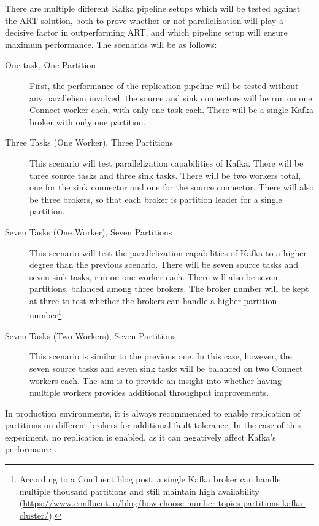 There are multiple different Kafka pipeline setups which will be tested against the \ac{ART} solution, both to prove whether or not parallelization will play a decisive factor in outperforming \ac{ART}, and which pipeline setup will ensure maximum performance. The scenarios will be as follows:
\begin{description}
    \item [One task, One Partition]
    First, the performance of the replication pipeline will be tested without any parallelism involved: the source and sink connectors will be run on one Connect worker each, with only one task each. There will be a single Kafka broker with only one partition.

    \item[Three Tasks (One Worker), Three Partitions]
    This scenario will test parallelization capabilities of Kafka. There will be three source tasks and three sink tasks. There will be two workers total, one for the sink connector and one for the source connector. There will also be three brokers, so that each broker is partition leader for a single partition.

    \item[Seven Tasks (One Worker), Seven Partitions]
    This scenario will test the parallelization capabilities of Kafka to a higher degree than the previous scenario. There will be seven source tasks and seven sink tasks, run on one worker each. There will also be seven partitions, balanced among three brokers. The broker number will be kept at three to test whether the brokers can handle a higher partition number\footnote{According to a Confluent blog post, a single Kafka broker can handle multiple thousand partitions and still maintain high availability (\url{https://www.confluent.io/blog/how-choose-number-topics-partitions-kafka-cluster/}).}.

    \item[Seven Tasks (Two Workers), Seven Partitions]
    This scenario is similar to the previous one. In this case, however, the seven source tasks and seven sink tasks will be balanced on two Connect workers each. The aim is to provide an insight into whether having multiple workers provides additional throughput improvements.
    
    
\end{description}

In production environments, it is always recommended to enable replication of partitions on different brokers for additional fault tolerance. In the case of this experiment, no replication is enabled, as it can negatively affect Kafka's performance \cite{dobbelaerekafkavsrabbitmq}.

